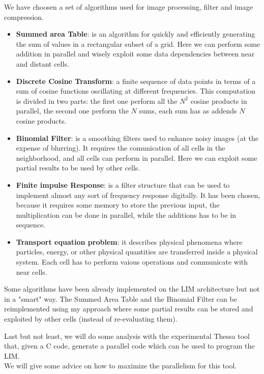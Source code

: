 \documentclass[12pt]{report}
\begin{document}
	
	We have choosen a set of algorithms used for image processing, filter and image compression.\\
	\begin{itemize}
		\item \textbf{Summed area Table}: is an algorithm for quickly and efficiently generating the sum of values in a rectangular subset of a grid. Here we can perform some addition in parallel and wisely exploit some data dependencies between near and distant cells.
		\item \textbf{Discrete Cosine Transform}: a finite sequence of data points in terms of a sum of cosine functions oscillating at different frequencies. This computation is divided in two parts: the first one perform all the $ N^2 $ cosine products in parallel, the second one perform the $N $ sums, each sum has as addends $N$ cosine products.
		\item \textbf{Binomial Filter}: is a smoothing filters used to enhance noisy images (at the expense of blurring). It requires the comunication of all cells in the neighborhood, and all cells can perform in parallel. Here we can exploit some partial results to be used by other cells.
		\item \textbf{Finite impulse Response}: is a filter structure that can be used to implement almost any sort of frequency response digitally. It has been chosen, because it requires some memory to store the previous input, the multiplication can be done in parallel, while the additions has to be in sequence.
		\item \textbf{Transport equation problem}: it describes physical phenomena where particles, energy, or other physical quantities are transferred inside a physical system. Each cell has to perform vaious operations and communicate with near cells.			\end{itemize}
	
	Some algorithms have been already implemented on the LIM architecture but not in a "smart" way. The Summed Area Table and the Binomial Filter can be reimplemented using my approach where some partial results can be stored and exploited by other cells (instead of re-evaluating them).		
\vspace{1cm}

Last but not least, we will do some analysis with the experimental Thessa tool that, given a C code,  generate a parallel code which can be used to program the LIM.\\
We will give some advice on how to maximize the parallelism for this tool.
 	
	 
	
\end{document}

